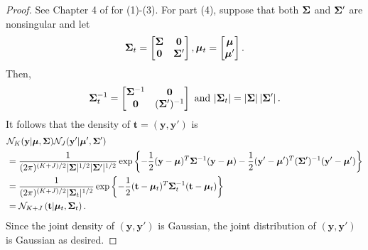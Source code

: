 \begin{proof}
    See Chapter 4 of \cite{murphy2012} for (1)-(3).
    For part (4), suppose that both $\boldsymbol{\Sigma}$ and $\boldsymbol{\Sigma}'$ are nonsingular
    and let
    \begin{equation*}
        \boldsymbol{\Sigma}_t =
        \begin{bmatrix}
            \boldsymbol{\Sigma} & \mathbf{0} \\
            \mathbf{0} & \boldsymbol{\Sigma}'
        \end{bmatrix}
        , \boldsymbol{\mu}_t =
        \begin{bmatrix}
            \boldsymbol{\mu} \\
            \boldsymbol{\mu}'
        \end{bmatrix}
        .
    \end{equation*}
    Then,
    \begin{equation*}
        \boldsymbol{\Sigma}_t^{-1}
        =
        \begin{bmatrix}
            \boldsymbol{\Sigma}^{-1} & \mathbf{0} \\
            \mathbf{0} & (\boldsymbol{\Sigma}')^{-1}
        \end{bmatrix}
        \text{ and }
        \lvert \boldsymbol{\Sigma}_t \rvert
        = \lvert \boldsymbol{\Sigma} \rvert \left\lvert \boldsymbol{\Sigma}' \right\rvert.
    \end{equation*}
    It follows that the density of $\mathbf{t} = (\mathbf{y}, \mathbf{y}')$ is
    \begin{align*}
        &\mathcal{N}_K(\mathbf{y} | \boldsymbol{\mu}, \boldsymbol{\Sigma})
        \mathcal{N}_J(\mathbf{y}' | \boldsymbol{\mu}', \boldsymbol{\Sigma}') \\
        & = \frac{ 1 }{ (2 \pi)^{(K + J)/2} \lvert \boldsymbol{\Sigma} \rvert^{1/2} \lvert \boldsymbol{\Sigma}' \rvert^{1/2} }
        \exp \left\{ -\frac12 (\mathbf{y} - \boldsymbol{\mu})^{T} \boldsymbol{\Sigma}^{-1} (\mathbf{y} - \boldsymbol{\mu})
        -\frac12 (\mathbf{y}' - \boldsymbol{\mu}')^{T} (\boldsymbol{\Sigma}')^{-1} (\mathbf{y}' - \boldsymbol{\mu}')  \right\} \\
        & = \frac{ 1 }{ (2 \pi)^{(K+ J)/2} \lvert \boldsymbol{\Sigma}_t \rvert^{1/2} }
        \exp \left\{ -\frac12 (\mathbf{t} - \boldsymbol{\mu}_t)^{T} \boldsymbol{\Sigma}_t^{-1} (\mathbf{t} - \boldsymbol{\mu}_t)  \right\} \\
        & = \mathcal{N}_{K + J} \left(
            \mathbf{t} | \boldsymbol{\mu}_t, \boldsymbol{\Sigma}_t
        \right).
    \end{align*}
    Since the joint density of $(\mathbf{y}, \mathbf{y}')$ is Gaussian, the joint distribution of $(\mathbf{y}, \mathbf{y}')$ is Gaussian as desired.
\end{proof}
